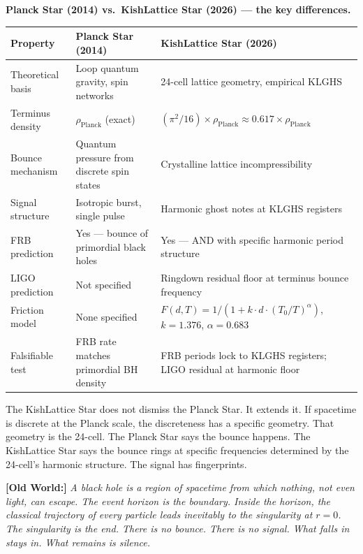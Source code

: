 \documentclass[11pt, letterpaper, openany]{book}
\newcommand{\oldworld}[1]{\noindent\textbf{\color{goldseal}[Old World:]}
  \textit{#1}\medskip}
\begin{document}
\begin{competitionbox}
\textbf{Planck Star (2014) vs.\ KishLattice Star (2026) --- the key differences.}

\vspace{0.5em}
\begin{tabular}{|p{3.5cm}|p{5.0cm}|p{5.0cm}|}
\hline
\rowcolor{kishblue!10}
\textbf{Property} & \textbf{Planck Star (2014)} & \textbf{KishLattice Star (2026)} \\
\hline\hline
Theoretical basis & Loop quantum gravity, spin networks & 24-cell lattice geometry, empirical KLGHS \\
\hline
Terminus density & $\rho_\text{Planck}$ (exact) & $(\pi^2/16) \times \rho_\text{Planck} \approx 0.617 \times \rho_\text{Planck}$ \\
\hline
Bounce mechanism & Quantum pressure from discrete spin states & Crystalline lattice incompressibility \\
\hline
Signal structure & Isotropic burst, single pulse & Harmonic ghost notes at KLGHS registers \\
\hline
FRB prediction & Yes --- bounce of primordial black holes & Yes --- AND with specific harmonic period structure \\
\hline
LIGO prediction & Not specified & Ringdown residual floor at terminus bounce frequency \\
\hline
Friction model & None specified & $F(d,T) = 1/(1 + k \cdot d \cdot (T_0/T)^\alpha)$, $k=1.376$, $\alpha=0.683$ \\
\hline
Falsifiable test & FRB rate matches primordial BH density & FRB periods lock to KLGHS registers; LIGO residual at harmonic floor \\
\hline
\end{tabular}
\end{competitionbox}

The KishLattice Star does not dismiss the Planck Star. It extends it.
If spacetime is discrete at the Planck scale, the discreteness has a specific
geometry. That geometry is the 24-cell. The Planck Star says the bounce
happens. The KishLattice Star says the bounce rings at specific frequencies
determined by the 24-cell's harmonic structure. The signal has fingerprints.

\oldworld{A black hole is a region of spacetime from which nothing, not even
light, can escape. The event horizon is the boundary. Inside the horizon,
the classical trajectory of every particle leads inevitably to the singularity
at $r = 0$. The singularity is the end. There is no bounce. There is no signal.
What falls in stays in. What remains is silence.}
\end{document}

